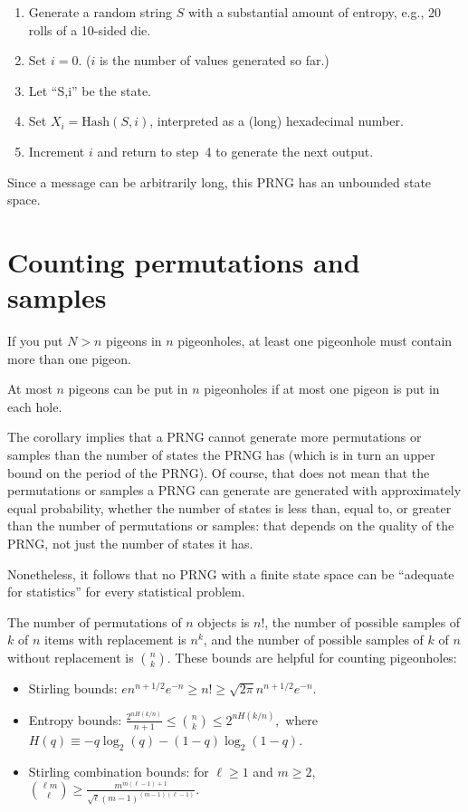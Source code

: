 \documentclass[graybox]{svmult}
\begin{document}
\begin{enumerate}
\item Generate a random string $S$ with a substantial amount of entropy, e.g., 20 rolls of a
10-sided die.
\item Set $i=0$. ($i$ is the number of values generated so far.)
\item Let ``S,i'' be the state.
\item Set $X_i = {\mbox{Hash}}(S,i)$, interpreted as a (long) hexadecimal number.
\item Increment $i$ and return to step~4 to generate the next output.
\end{enumerate}

Since a message can be arbitrarily long, this PRNG has an unbounded state space.

\section{Counting permutations and samples}
\label{sec:count}

\begin{theorem}
If you put $N>n$ pigeons in $n$ pigeonholes, at least one
pigeonhole must contain more than one pigeon.
\end{theorem}

\begin{corollary}
At most $n$ pigeons can be put in $n$ pigeonholes if at most
one pigeon is put in each hole.
\end{corollary}

The corollary implies that a PRNG cannot generate more permutations or samples than the number of states the PRNG has (which is in turn an upper bound on the period of the PRNG).
Of course, that does not mean that the permutations or samples a PRNG can generate are generated with approximately equal probability, whether the number of states is less than, equal to, or greater than the number of
permutations or samples: that depends on the quality of the PRNG, not just the number of states it has.

Nonetheless, it follows that no PRNG with a finite state space can be ``adequate for statistics'' for every statistical problem.

The number of permutations of $n$ objects is $n!$, the number of possible samples of $k$ of $n$ items
with replacement is $n^k$,  and the number of possible samples of $k$ of $n$ without replacement is $n \choose k$.
These bounds are helpful for counting pigeonholes:
\begin{itemize}
\item Stirling bounds: $ e n^{n+1/2} e^{-n} \ge n! \ge \sqrt{2 \pi} n^{n+1/2} e^{-n}.$
\item Entropy bounds:
$ \frac{2^{nH(k/n)}}{n+1} \le {n \choose k} \le 2^{nH(k/n)},$ where $H(q) \equiv -q \log_2(q) - (1-q) \log_2 (1-q)$.
\item Stirling combination bounds:
for $\ell \ge 1$ and $m \ge 2$, $ { {\ell m } \choose { \ell }} \ge \frac{m^{m(\ell-1)+1}}{\sqrt{\ell} (m-1)^{(m-1)(\ell-1)}}. $
\end{itemize}
\end{document}

